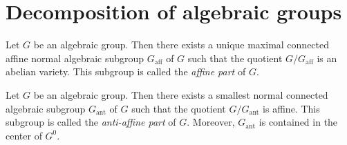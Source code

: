 \section{Decomposition of algebraic groups}

    \begin{theorem}\label{thm:Chavellaye_decomposition}
        Let \(G\) be an algebraic group.
        Then there exists a unique maximal connected affine normal algebraic subgroup \(G_{\text{aff}}\) of \(G\) such that the quotient \(G/G_{\text{aff}}\) is an abelian variety.
        This subgroup is called the \emph{affine part} of \(G\).
    \end{theorem}

    \begin{theorem}\label{thm:Rosenlicht_decomposition}
        Let \(G\) be an algebraic group.
        Then there exists a smallest normal connected algebraic subgroup \(G_{\text{ant}}\) of \(G\) such that the quotient \(G/G_{\text{ant}}\) is affine.
        This subgroup is called the \emph{anti-affine part} of \(G\).
        Moreover, \(G_{\text{ant}}\) is contained in the center of \(G^0\).
    \end{theorem}

\subsection{}
